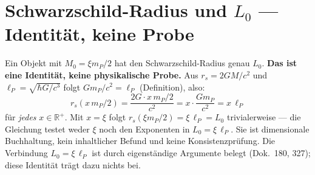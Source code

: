 \section*{Schwarzschild-Radius und $L_0$ --- Identität, keine Probe}

Ein Objekt mit $M_0 = \xi m_P/2$ hat den Schwarzschild-Radius genau $L_0$.
\textbf{Das ist eine Identität, keine physikalische Probe.}
Aus $r_s = 2GM/c^2$ und $\ell_P = \sqrt{\hbar G/c^3}$ folgt
$Gm_P/c^2 = \ell_P$ (Definition), also:
\[
  r_s(x\,m_P/2) = \frac{2G\cdot x\,m_P/2}{c^2} = x\cdot\frac{Gm_P}{c^2} = x\,\ell_P
\]
für \emph{jedes} $x\in\mathbb{R}^+$. Mit $x=\xi$ folgt $r_s(\xi m_P/2)=\xi\,\ell_P=L_0$
trivialerweise --- die Gleichung testet weder $\xi$ noch den Exponenten in $L_0=\xi\,\ell_P$.
Sie ist dimensionale Buchhaltung, kein inhaltlicher Befund und keine Konsistenzprüfung.
Die Verbindung $L_0=\xi\,\ell_P$ ist durch eigenständige Argumente belegt
(Dok.~180, 327); diese Identität trägt dazu nichts bei.
